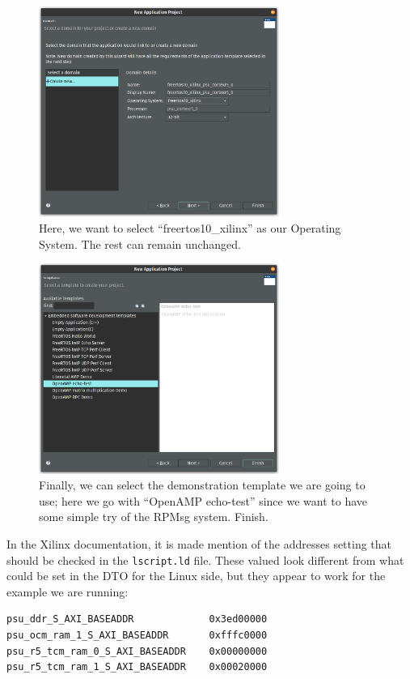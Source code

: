 \documentclass[10pt]{article}
\begin{document}
\begin{figure}[H]
  \centering
  \includegraphics[width=0.7\textwidth]{./img/vitis_new/project6}
  \caption{Here, we want to select ``freertos10\_xilinx'' as our Operating System. The rest can remain unchanged.}
  \label{fig:project6}
\end{figure}

\begin{figure}[H]
  \centering
  \includegraphics[width=0.7\textwidth]{./img/vitis_new/project7}
  \caption{Finally, we can select the demonstration template we are going to use; here we go with ``OpenAMP echo-test'' since we want to
    have some simple try of the RPMsg system. Finish.}
  \label{fig:project7}
\end{figure}


In the Xilinx documentation, it is made mention of the addresses setting that should be checked in the \verb|lscript.ld| file.
These valued look different from what could be set in the DTO for the Linux side, but they appear to
work for the example we are running:
\begin{tcolorbox}
\begin{verbatim}
psu_ddr_S_AXI_BASEADDR             0x3ed00000
psu_ocm_ram_1_S_AXI_BASEADDR       0xfffc0000
psu_r5_tcm_ram_0_S_AXI_BASEADDR    0x00000000
psu_r5_tcm_ram_1_S_AXI_BASEADDR    0x00020000
\end{verbatim}
\end{tcolorbox}
\end{document}
